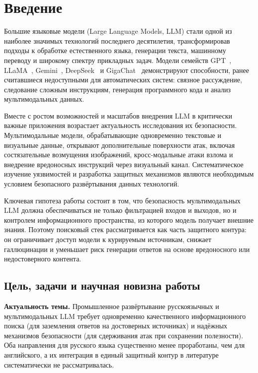 \chapter*{Введение}

Большие языковые модели (Large Language Models, LLM) стали одной из наиболее значимых технологий последнего десятилетия, трансформировав подходы к обработке естественного языка, генерации текста, машинному переводу и широкому спектру прикладных задач. Модели семейств GPT~\cite{radford2018gpt,radford2019gpt2,brown2020gpt3,achiam2023gpt4}, LLaMA~\cite{touvron2023llama}, Gemini~\cite{team2023gemini}, DeepSeek~\cite{deepseek2024v2} и GigaChat~\cite{2506.09440} демонстрируют способности, ранее считавшиеся недоступными для автоматических систем: связное рассуждение, следование сложным инструкциям, генерация программного кода и анализ мультимодальных данных.

Вместе с ростом возможностей и масштабов внедрения LLM в критически важные приложения возрастает актуальность исследования их безопасности. Мультимодальные модели, обрабатывающие одновременно текстовые и визуальные данные, открывают дополнительные поверхности атак, включая состязательные возмущения изображений, кросс-модальные атаки взлома и внедрение вредоносных инструкций через визуальный канал. Систематическое изучение уязвимостей и разработка защитных механизмов являются необходимым условием безопасного развёртывания данных технологий.

Ключевая гипотеза работы состоит в том, что безопасность мультимодальных LLM должна обеспечиваться не только фильтрацией входов и выходов, но и контролем информационного пространства, из которого модель получает внешние знания. Поэтому поисковый стек рассматривается как часть защитного контура: он ограничивает доступ модели к курируемым источникам, снижает галлюцинации и уменьшает риск генерации ответов на основе вредоносного или недостоверного контента.

\section*{Цель, задачи и научная новизна работы}

\textbf{Актуальность темы.} Промышленное развёртывание русскоязычных и мультимодальных LLM требует одновременно качественного информационного поиска (для заземления ответов на достоверных источниках) и надёжных механизмов безопасности (для сдерживания атак при сохранении полезности). Оба направления для русского языка существенно менее проработаны, чем для английского, а их интеграция в единый защитный контур в литературе систематически не рассматривалась.

